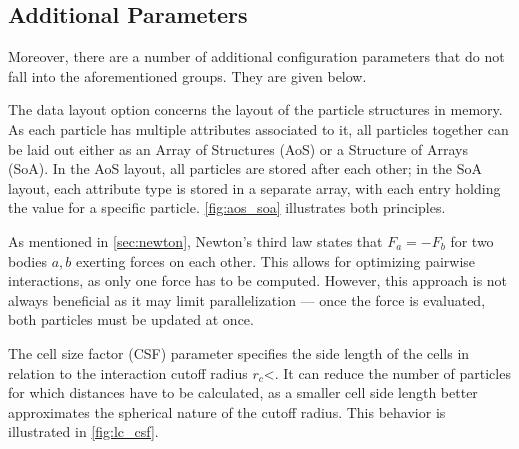 \subsection{Additional Parameters}
Moreover, there are a number of additional configuration parameters that do not fall into the aforementioned groups. They are given below.

\begin{description}[leftmargin=!,labelwidth=\widthof{\textbf{Cell Size Factor}}]
	\item[\textbf{Data Layout}] The data layout option concerns the layout of the particle structures in memory. As each particle has multiple attributes associated to it, all particles together can be laid out either as an Array of Structures (AoS) or a Structure of Arrays (SoA). In the AoS layout, all particles are stored after each other; in the SoA layout, each attribute type is stored in a separate array, with each entry holding the value for a specific particle. \autoref{fig:aos_soa} illustrates both principles.
	\item[\textbf{Newton3}] As mentioned in \autoref{sec:newton}, Newton's third law states that $F_a = -F_b$ for two bodies $a, b$ exerting forces on each other. This allows for optimizing pairwise interactions, as only one force has to be computed. However, this approach is not always beneficial as it may limit parallelization --- once the force is evaluated, both particles must be updated at once.
	\item[\textbf{Cell Size Factor}] The cell size factor (CSF) parameter specifies the side length of the cells in relation to the interaction cutoff radius $r_c$<. It can reduce the number of particles for which distances have to be calculated, as a smaller cell side length better approximates the spherical nature of the cutoff radius. This behavior is illustrated in  \autoref{fig:lc_csf}.
\end{description}


